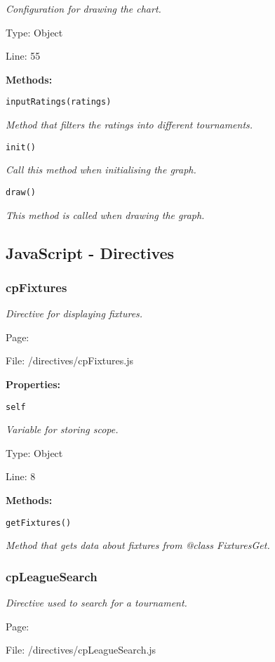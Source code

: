 {\scriptsize
\textit{Configuration for drawing the chart.}

Type: Object

Line: 55

}
\textbf{Methods:}

\texttt{inputRatings(ratings)}

{\scriptsize
\textit{Method that filters the ratings into different tournaments.}

}

\texttt{init()}

{\scriptsize
\textit{Call this method when initialising the graph.}

}

\texttt{draw()}

{\scriptsize
\textit{This method is called when drawing the graph.}

}

\subsection{JavaScript - Directives}
\subsubsection{cpFixtures}\label{cpFixtures.js.doc}
\textit{Directive for displaying fixtures.}

Page: \pageref{cpFixtures.js}

File: /directives/cpFixtures.js

\textbf{Properties:}

\texttt{self}

{\scriptsize
\textit{Variable for storing scope.}

Type: Object

Line: 8

}
\textbf{Methods:}

\texttt{getFixtures()}

{\scriptsize
\textit{Method that gets data about fixtures from @class FixturesGet.}

}

\subsubsection{cpLeagueSearch}\label{cpLeagueSearch.js.doc}
\textit{Directive used to search for a tournament.}

Page: \pageref{cpLeagueSearch.js}

File: /directives/cpLeagueSearch.js

